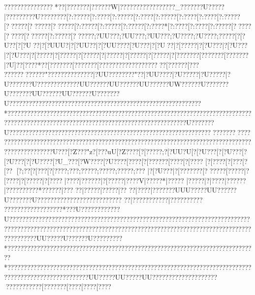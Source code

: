 {{{{{{{{{{{{{{{{{{{{{{{{{{{{{{{{{{{{{{{{{{{{{{{{{{{{{{{{{{{{{{{{{{{{{{{{{{{{{{{{{{{{{{{{{{{{{{{{{{{{{{{{{{{{{{{{{{{{{{{{{{{{{{{{{{{{{{{{{{{{{{{{{{{{{{{{{{{{{{{{{{{{{{{{{{{{{{{{{{{{{{{{{{{{{{{{{{{{{{{{{{{{{{{{{{{{{{{{{{{{{{{{{{{{{{{{{{{{{{{{{{{{{{{{{{{{{{{{{{{{{{{{{{{{{{{{{{{{{{{{{{{{{{{{{{{{{{{{{{{{{{{{{{{{{{{{{{{{{{{{{{{{{{{{{{{{{{{{{{{{{{{{{{{{{{{{{{{{{{{{{{{{{{{{{{{{{{{{{{{{{{{{{{{{{{{{{{{{{{{{{{{{{{{{{{{{{{{{{{{{{{{{{{{{{{{{{{{{{{{{{{{{{{{{{{{{{{{{{{{{{{{{{{{{{{{{{{{{{{{{{{{{{{{{{{{{{{{{{{{{{{{{{{{{{{{{{{{{{{{{{{{{{{{{{{{{{{{{{{{{{{{???????????????*??|???????|??????W|?????????{???? ????_???????U?????|?????????U?????{???  [?:?????[?:????[?:?????[?:????[?:?????[?:????[?:????[?:?????[??????[??????[??????[?:?????[?:?????[?:?????[?:????*[?:???? [?:???? [?:?????[????? [????? [??????[?:?????[????? {?;?UU??{?;?UU??{?;?UU??{?;?U???{?;?U???{?;?????[?[?U}??[?[?U??|?[?UUU?|?[?UU??|?[?UU????[?U???|?[?U??|?[?????|?[?U???|?[?U???|?[?U???|?[?????|?[?????|?[?????[?|?????|?[?????|?[?????|?[???????[???????[???????|?U]??[????*??[???????[???????[???????{???????{??????[???? ??[???
 ??{??????{????"??{???? ??{???? ??|?UU????{????"??|?UU????|?U?????|?U?????|?U???????U???????  ??????UU??????UU??????UU??????UW??????U???????U???????UU??????UU??????U???????U???????????????????????????????????????????????????????????*???????????????????????????????????????????????????????????????????????????????????????????????????????????????????????????? ???????U???????U??????????????????????? ???????????????????????????????????????????????????? ??????? ?????? ????????????????????????????????????????????????????????????????????????????U???[?Z???" z?[???uU[?Z???? [?[?????;?[?UU?U[?[?U???[?[?U???[?[?U???[?[?U???{?[?U_??{?[?W???{?[?U???{?[?}???[?[?????{?[????[?[????
[?[???? [?[??? [?[??
 [?;??   [?[???  [?[???  {?;?? {?;???? {?;???? {?;???? {?;???
 |?[?U???|?[???????[??????[?????|?[???? |?[?????|?[????|?{???|?{?????|?[???? {?|????V|?{????*|?{????
|?{???? |?|?? ??|???? ??|???? ??{????*??\???  ??|???
 ??|???  ??|???  ??|??
  ??|??   ??|???  ????UUU?????UU??????U???????U??????????????????????????
??|???  ??????  ??|???? ??????
 ????? ??????? ??????* ???U?????????  ???U????????????????????????????????????????????????????????????????????????????????????????????????????????????????????????????????????????????????????????????????UU?????U??????U?????????*?????????????????????????????????????????????????????????????????????????????*?????????????????????????????????????????????????????????????????????????????????????????????????????UU?????UU?????UU???????????????????????????????[?{?????{?[???{?[???{?[????
}}}}}}}}}}}}}}}}}}}}}}}}}}}}}}}}}}}}}}}}}}}}}}}}}}}}}}}}}}}}}}}}}}}}}}}}}}}}}}}}}}}}}}}}}}}}}}}}}}}}}}}}}}}}}}}}}}}}}}}}}}}}}}}}}}}}}}}}}}}}}}}}}}}}}}}}}}}}}}}}}}}}}}}}}}}}}}}}}}}}}}}}}}}}}}}}}}}}}}}}}}}}}}}}}}}}}}}}}}}}}}}}}}}}}}}}}}}}}}}}}}}}}}}}}}}}}}}}}}}}}}}}}}}}}}}}}}}}}}}}}}}}}}}}}}}}}}}}}}}}}}}}}}}}}}}}}}}}}}}}}}}}}}}}}}}}}}}}}}}}}}}}}}}}}}}}}}}}}}}}}}}}}}}}}}}}}}}}}}}}}}}}}}}}}}}}}}}}}}}}}}}}}}}}}}}}}}}}}}}}}}}}}}}}}}}}}}}}}}}}}}}}}}}}}}}}}}}}}}}}}}}}}}}}}}}}}}}}}}}}}}}}}}}}}}}}}}}}}}}}}}}}}}}}}}}}}}}}}}}}}}}}}}}}}}}}}}}}}}}}}}}}}}}}}}}}}}}}}}}}}}}}}}}}}}}}}}}}}
